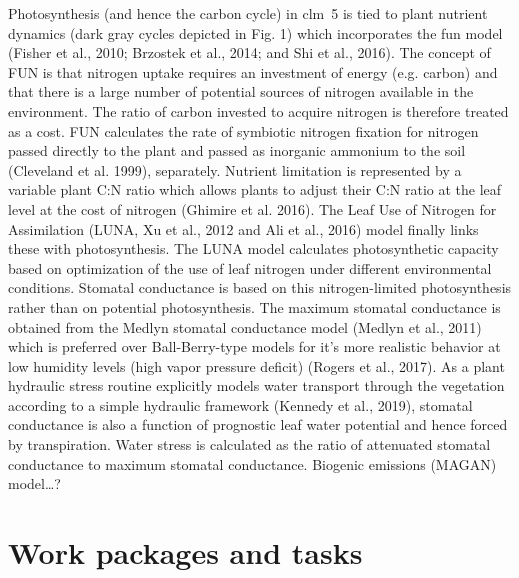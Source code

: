 \documentclass[11pt, a4paper, oneside, article]{memoir}
\begin{document}
Photosynthesis (and hence the carbon cycle) in \gls{clm}~5 is tied to plant nutrient dynamics (dark gray cycles depicted in Fig. 1) which incorporates the \gls{fun} model (Fisher et al., 2010; Brzostek et al., 2014; and Shi et al., 2016). The concept of FUN is that nitrogen uptake requires an investment of energy (e.g. carbon) and that there is a large number of potential sources of nitrogen available in the environment. The ratio of carbon invested to acquire nitrogen is therefore treated as a cost. FUN calculates the rate of symbiotic nitrogen fixation for nitrogen passed directly to the plant and passed as inorganic ammonium to the soil (Cleveland et al. 1999), separately. Nutrient limitation is represented by a variable plant C:N ratio which allows plants to adjust their C:N ratio at the leaf level at the cost of nitrogen (Ghimire et al. 2016). The Leaf Use of Nitrogen for Assimilation (LUNA, Xu et al., 2012 and Ali et al., 2016) model finally links these with photosynthesis. The LUNA model calculates photosynthetic capacity based on optimization of the use of leaf nitrogen under different environmental conditions. Stomatal conductance is based on this nitrogen-limited photosynthesis rather than on potential photosynthesis. The maximum stomatal conductance is obtained from the Medlyn stomatal conductance model (Medlyn et al., 2011) which is preferred over Ball-Berry-type models for it’s more realistic behavior at low humidity levels (high vapor pressure deficit) (Rogers et al., 2017).  
As a plant hydraulic stress routine explicitly models water transport through the vegetation according to a simple hydraulic framework (Kennedy et al., 2019), stomatal conductance is also a function of prognostic leaf water potential and hence forced by transpiration. Water stress is calculated as the ratio of attenuated stomatal conductance to maximum stomatal conductance.
Biogenic emissions (MAGAN) model…?

\chapter{Work packages and tasks}

\printglossaries

\newpage
\printbibliography[env=bibliography]
\end{document}

